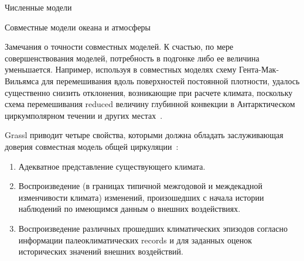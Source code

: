 \begin{chapter}{Численные модели}
\begin{section}{Совместные модели океана и атмосферы}
\begin{paragraph}{Замечания о точности совместных моделей.}
К счастью, по мере совершенствования моделей, потребность в подгонке либо
ее величина уменьшается. Например, используя в совместных моделях
схему Гента-Мак-Вильямса для перемешивания%
вдоль поверхностей постоянной плотности, удалось существенно снизить
отклонения, возникающие при расчете климата, поскольку схема перемешивания%
 reduced величину глубинной
конвекции в Антарктическом циркумполярном течении%
 и других
местах~\cite{Hirst:2000}.
%

Grassl приводит четыре свойства, которыми должна обладать заслуживающая 
доверия совместная модель общей циркуляции~\cite{Grassl:2000}:
%
\begin{enumerate}
\item
Адекватное представление существующего климата.
%

\item
Воспроизведение (в границах типичной межгодовой и междекадной изменчивости
климата) изменений, произошедших с начала истории наблюдений по имеющимся
данным о внешних воздействиях.
%

\item
Воспроизведение различных прошедших климатических эпизодов согласно
информации палеоклиматических records и для заданных оценок исторических
значений внешних воздействий.
%


\end{enumerate}
\end{paragraph}
\end{section}
\end{chapter}
